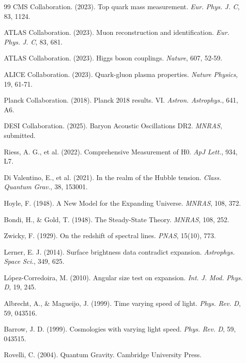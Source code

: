 \begin{thebibliography}{99}
		CMS Collaboration. (2023). Top quark mass measurement. \emph{Eur. Phys. J. C}, 83, 1124.
		
		ATLAS Collaboration. (2023). Muon reconstruction and identification. \emph{Eur. Phys. J. C}, 83, 681.
		
		ATLAS Collaboration. (2023). Higgs boson couplings. \emph{Nature}, 607, 52-59.
		
		ALICE Collaboration. (2023). Quark-gluon plasma properties. \emph{Nature Physics}, 19, 61-71.
		
		Planck Collaboration. (2018). Planck 2018 results. VI. \emph{Astron. Astrophys.}, 641, A6.
		
		DESI Collaboration. (2025). Baryon Acoustic Oscillations DR2. \emph{MNRAS}, submitted.
		
		Riess, A. G., et al. (2022). Comprehensive Measurement of H0. \emph{ApJ Lett.}, 934, L7.
		
		Di Valentino, E., et al. (2021). In the realm of the Hubble tension. \emph{Class. Quantum Grav.}, 38, 153001.
		
		Hoyle, F. (1948). A New Model for the Expanding Universe. \emph{MNRAS}, 108, 372.
		
		Bondi, H., \& Gold, T. (1948). The Steady-State Theory. \emph{MNRAS}, 108, 252.
		
		Zwicky, F. (1929). On the redshift of spectral lines. \emph{PNAS}, 15(10), 773.
		
		Lerner, E. J. (2014). Surface brightness data contradict expansion. \emph{Astrophys. Space Sci.}, 349, 625.
		
		López-Corredoira, M. (2010). Angular size test on expansion. \emph{Int. J. Mod. Phys. D}, 19, 245.
		
		Albrecht, A., \& Magueijo, J. (1999). Time varying speed of light. \emph{Phys. Rev. D}, 59, 043516.
		
		Barrow, J. D. (1999). Cosmologies with varying light speed. \emph{Phys. Rev. D}, 59, 043515.
		
		Rovelli, C. (2004). Quantum Gravity. Cambridge University Press.
		

\end{thebibliography}
